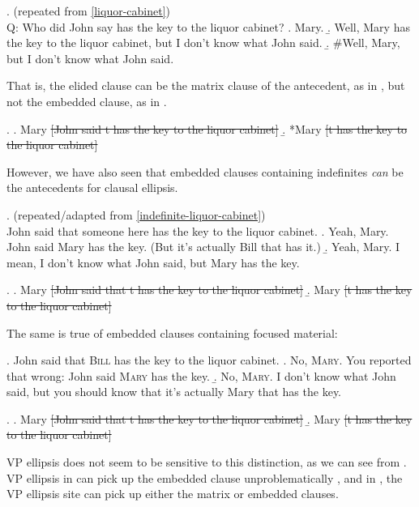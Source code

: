 \documentclass[doublespace]{umthesis}
\begin{document}
\ex. 	(repeated from \ref{liquor-cabinet})\\
	Q: Who did John say has the key to the liquor cabinet?
	\a. Mary.
	\b. Well, Mary has the key to the liquor cabinet, but I don't know what John said.
	\b. \#Well, Mary, but I don't know what John said.
	
That is, the elided clause can be the matrix clause of the antecedent, as in \Next[a], but not the embedded clause, as in \Next[b].

\ex. 	\a. Mary \sout{[John said t has the key to the liquor cabinet]}
	\b. *Mary \sout{[t has the key to the liquor cabinet]}
	
However, we have also seen that embedded clauses containing indefinites \emph{can} be the antecedents for clausal ellipsis.

\ex. 	(repeated/adapted from \ref{indefinite-liquor-cabinet})\\
	John said that someone here has the key to the liquor cabinet.
	\a. Yeah, Mary. John said Mary has the key. (But it's actually Bill that has it.)
	\b. Yeah, Mary. I mean, I don't know what John said, but Mary has the key.
	
\ex. 	\a. Mary \sout{[John said that t has the key to the liquor cabinet]}
	\b. Mary \sout{[t has the key to the liquor cabinet]}
	
The same is true of embedded clauses containing focused material:

\ex. 	John said that \textsc{Bill} has the key to the liquor cabinet.
	\a. No, \textsc{Mary}. You reported that wrong: John said \textsc{Mary} has the key.
	\b. No, \textsc{Mary}. I don't know what John said, but you should know that it's actually Mary that has the key.
	
\ex. 	\a. Mary \sout{[John said that t has the key to the liquor cabinet]}
	\b. Mary \sout{[t has the key to the liquor cabinet]}
	
VP ellipsis does not seem to be sensitive to this distinction, as we can see from \Next. VP ellipsis in \Next can pick up the embedded clause unproblematically%
, and in \NNext, the VP ellipsis site can pick up either the matrix or embedded clauses.
\end{document}
